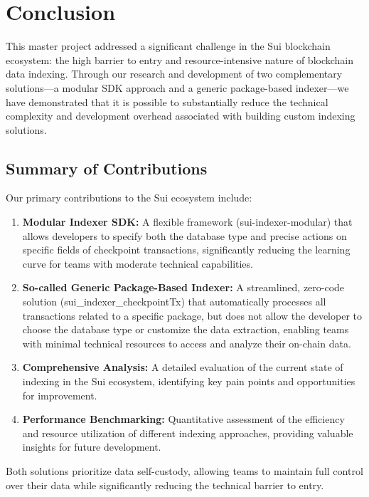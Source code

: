 \section{Conclusion}

This master project addressed a significant challenge in the Sui blockchain ecosystem: the high barrier to entry and resource-intensive nature of blockchain data indexing. Through our research and development of two complementary solutions—a modular SDK approach and a generic package-based indexer—we have demonstrated that it is possible to substantially reduce the technical complexity and development overhead associated with building custom indexing solutions.

\subsection{Summary of Contributions}

Our primary contributions to the Sui ecosystem include:

\begin{enumerate}
    \item \textbf{Modular Indexer SDK:} A flexible framework (sui-indexer-modular) that allows developers to specify both the database type and precise actions on specific fields of checkpoint transactions, significantly reducing the learning curve for teams with moderate technical capabilities.
    
    \item \textbf{So-called Generic Package-Based Indexer:} A streamlined, zero-code solution (sui\_indexer\_checkpointTx) that automatically processes all transactions related to a specific package, but does not allow the developer to choose the database type or customize the data extraction, enabling teams with minimal technical resources to access and analyze their on-chain data.
    
    \item \textbf{Comprehensive Analysis:} A detailed evaluation of the current state of indexing in the Sui ecosystem, identifying key pain points and opportunities for improvement.
    
    \item \textbf{Performance Benchmarking:} Quantitative assessment of the efficiency and resource utilization of different indexing approaches, providing valuable insights for future development.
\end{enumerate}

Both solutions prioritize data self-custody, allowing teams to maintain full control over their data while significantly reducing the technical barrier to entry.

